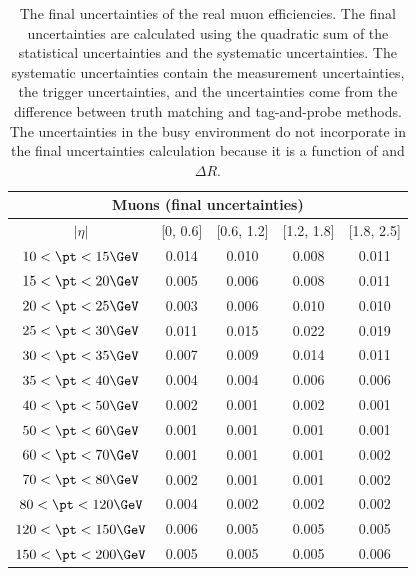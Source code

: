 \begin{table}[htbp]
\begin{center}
\begin{tabular}{ccccc}
\hline
\hline
\multicolumn{5}{c}{Muons (final uncertainties)}\\
\hline
$|\eta|$ & [0, 0.6] & [0.6, 1.2] & [1.2, 1.8] & [1.8, 2.5]\\
\hline
$10<\pt<15 \GeV$ & 0.014 & 0.010 & 0.008 & 0.011\\
$15<\pt<20 \GeV$ & 0.005 & 0.006 & 0.008 & 0.011\\
$20<\pt<25 \GeV$ & 0.003 & 0.006 & 0.010 & 0.010\\
$25<\pt<30 \GeV$ & 0.011 & 0.015 & 0.022 & 0.019\\
$30<\pt<35 \GeV$ & 0.007 & 0.009 & 0.014 & 0.011\\
$35<\pt<40 \GeV$ & 0.004 & 0.004 & 0.006 & 0.006\\
$40<\pt<50 \GeV$ & 0.002 & 0.001 & 0.002 & 0.001\\
$50<\pt<60 \GeV$ & 0.001 & 0.001 & 0.001 & 0.001\\
$60<\pt<70 \GeV$ & 0.001 & 0.001 & 0.001 & 0.002\\
$70<\pt<80 \GeV$ & 0.002 & 0.001 & 0.001 & 0.002\\
$80<\pt<120 \GeV$ & 0.004 & 0.002 & 0.002 & 0.002\\
$120<\pt<150 \GeV$ & 0.006 & 0.005 & 0.005 & 0.005\\
$150<\pt<200 \GeV$ & 0.005 & 0.005 & 0.005 & 0.006\\
\hline
\hline
\end{tabular}
\caption{The final uncertainties of the real muon efficiencies.
The final uncertainties are calculated using the quadratic sum of the statistical uncertainties and the systematic uncertainties.
The systematic uncertainties contain the measurement uncertainties, the trigger uncertainties, and the uncertainties come from the difference between truth matching and tag-and-probe methods.
The uncertainties in the busy environment do not incorporate in the final uncertainties calculation because it is a function of \pT and $\Delta R$.
}
\label{tab:RLE_final_uncertainties_muon}
\end{center}
\end{table}



